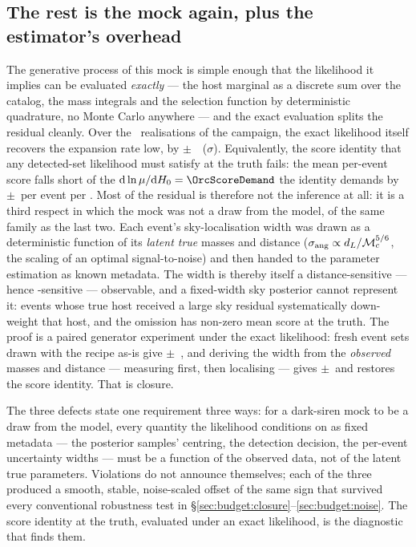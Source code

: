 \subsection{The rest is the mock again, plus the estimator's overhead}
\label{sec:budget:oracle}

The generative process of this mock is simple enough that the likelihood it
implies can be evaluated \emph{exactly} --- the host marginal as a discrete
sum over the catalog, the mass integrals and the selection function by
deterministic quadrature, no Monte Carlo anywhere --- and the exact evaluation
splits the residual cleanly. Over the \OrcN\ realisations of the campaign, the
exact likelihood itself recovers the expansion rate low, by
\OrcExactOff$\pm$\OrcExactSem~\kmsmpc\ (\OrcExactSig$\sigma$). Equivalently,
the score identity that any detected-set likelihood must satisfy at the truth
fails: the mean per-event score falls short of the
$\dd\ln\mu/\dd\Hz = \OrcScoreDemand$ the identity demands by
\OrcScoreDef$\pm$\OrcScoreDefSem\ per event per \kmsmpc. Most of the residual
is therefore not the inference at all: it is a third respect in which the mock
was not a draw from the model, of the same family as the last two. Each
event's sky-localisation width was drawn as a deterministic function of its
\emph{latent true} masses and distance
($\sigma_{\rm ang} \propto d_L / \mathcal{M}_c^{5/6}$, the scaling of an
optimal signal-to-noise) and then handed to the parameter estimation as known
metadata. The width is thereby itself a distance-sensitive --- hence
\Hz-sensitive --- observable, and a fixed-width sky posterior cannot represent
it: events whose true host received a large sky residual systematically
down-weight that host, and the omission has non-zero mean score at the truth.
The proof is a paired generator experiment under the exact likelihood: fresh
event sets drawn with the recipe as-is give
\OrcBootAsisOff$\pm$\OrcBootAsisSem~\kmsmpc, and deriving the width from the
\emph{observed} masses and distance --- measuring first, then localising ---
gives \OrcBootFixOff$\pm$\OrcBootFixSem\ and restores the score identity.
That is closure.

The three defects state one requirement three ways: for a dark-siren mock to
be a draw from the model, every quantity the likelihood conditions on as fixed
metadata --- the posterior samples' centring, the detection decision, the
per-event uncertainty widths --- must be a function of the observed data, not
of the latent true parameters. Violations do not announce themselves; each of
the three produced a smooth, stable, noise-scaled offset of the same sign that
survived every conventional robustness test in
\S\ref{sec:budget:closure}--\ref{sec:budget:noise}. The score identity at the
truth, evaluated under an exact likelihood, is the diagnostic that finds them.

